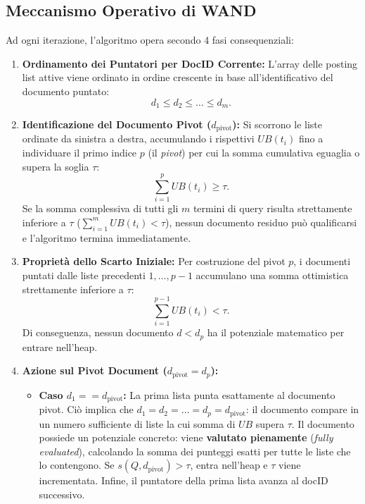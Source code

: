 \subsection{Meccanismo Operativo di WAND}
Ad ogni iterazione, l'algoritmo opera secondo 4 fasi consequenziali:
\begin{enumerate}
    \item \textbf{Ordinamento dei Puntatori per DocID Corrente:} L'array delle posting list attive viene ordinato in ordine crescente in base all'identificativo del documento puntato:
    \begin{equation}
        d_1 \le d_2 \le \dots \le d_m.
        \label{eq:wand-sorted-ptrs}
    \end{equation}
    \item \textbf{Identificazione del Documento Pivot ($d_{\text{pivot}}$):} Si scorrono le liste ordinate da sinistra a destra, accumulando i rispettivi $UB(t_i)$ fino a individuare il primo indice $p$ (il \textit{pivot}) per cui la somma cumulativa eguaglia o supera la soglia $\tau$:
    \begin{equation}
        \sum_{i=1}^{p} UB(t_i) \ge \tau.
        \label{eq:wand-pivot-condition}
    \end{equation}
    Se la somma complessiva di tutti gli $m$ termini di query risulta strettamente inferiore a $\tau$ ($\sum_{i=1}^m UB(t_i) < \tau$), nessun documento residuo pu\`o qualificarsi e l'algoritmo termina immediatamente.
    \item \textbf{Propriet\`a dello Scarto Iniziale:} Per costruzione del pivot $p$, i documenti puntati dalle liste precedenti $1, \dots, p-1$ accumulano una somma ottimistica strettamente inferiore a $\tau$:
    \begin{equation*}
        \sum_{i=1}^{p-1} UB(t_i) < \tau.
    \end{equation*}
    Di conseguenza, nessun documento $d < d_p$ ha il potenziale matematico per entrare nell'heap.
    \item \textbf{Azione sul Pivot Document ($d_{\text{pivot}} = d_p$):}
    \begin{itemize}
        \item \textbf{Caso $d_1 == d_{\text{pivot}}$:} La prima lista punta esattamente al documento pivot. Ci\`o implica che $d_1 = d_2 = \dots = d_p = d_{\text{pivot}}$: il documento compare in un numero sufficiente di liste la cui somma di $UB$ supera $\tau$. Il documento possiede un potenziale concreto: viene \textbf{valutato pienamente} (\textit{fully evaluated}), calcolando la somma dei punteggi esatti per tutte le liste che lo contengono. Se $s(Q, d_{\text{pivot}}) > \tau$, entra nell'heap e $\tau$ viene incrementata. Infine, il puntatore della prima lista avanza al docID successivo.

\end{itemize}
\end{enumerate}
